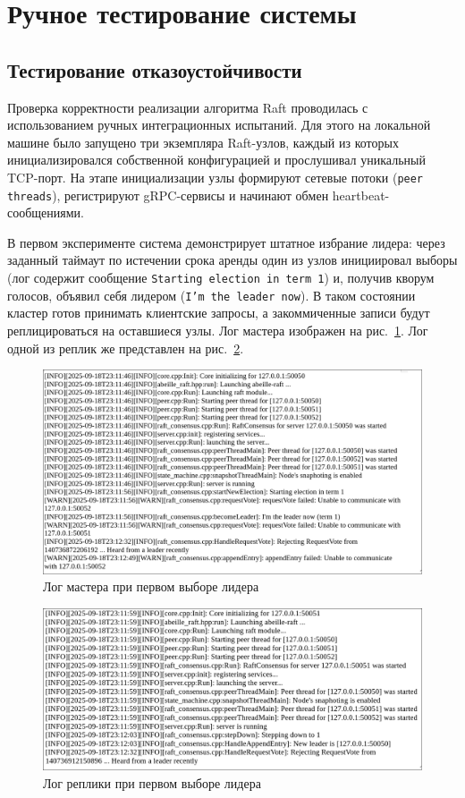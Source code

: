 \section{Ручное тестирование системы}

\subsection{Тестирование отказоустойчивости}

Проверка корректности реализации алгоритма Raft проводилась с использованием
ручных интеграционных испытаний. Для этого на локальной машине было запущено
три экземпляра Raft-узлов, каждый из которых инициализировался собственной
конфигурацией и прослушивал уникальный TCP-порт. На этапе инициализации узлы
формируют сетевые потоки (\texttt{peer threads}), регистрируют gRPC-сервисы и
начинают обмен heartbeat-сообщениями.

В первом эксперименте система демонстрирует штатное избрание лидера:
через заданный таймаут по истечении срока аренды один из узлов инициировал
выборы (лог содержит сообщение \texttt{Starting election in term 1}) и,
получив кворум голосов, объявил себя лидером (\texttt{I'm the leader now}).
В таком состоянии кластер готов принимать клиентские запросы, а
закоммиченные записи будут реплицироваться на оставшиеся узлы. Лог мастера
изображен на рис.~\ref{fig:leader_log}. Лог одной из реплик же представлен
на рис.~\ref{fig:replica_log}.

\begin{figure}
  \centering
  \includegraphics[scale=0.4]{inc/leader-log.png}
  \caption{Лог мастера при первом выборе лидера}
  \label{fig:leader_log}
\end{figure}

\begin{figure}
  \centering
  \includegraphics[scale=0.4]{inc/replica-log.png}
  \caption{Лог реплики при первом выборе лидера}
  \label{fig:replica_log}
\end{figure}

